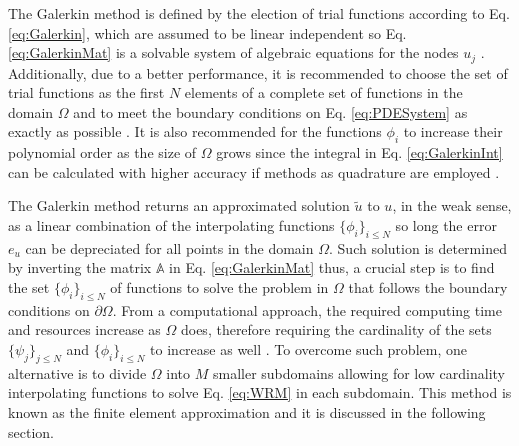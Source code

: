     The Galerkin method is defined by the election of trial functions according to Eq. \eqref{eq:Galerkin}, which are assumed to be linear independent so Eq. \eqref{eq:GalerkinMat} is a solvable system of algebraic equations for the nodes $u_j$ \cite{fletcher_computational_1984}. Additionally, due to a  better performance, it is recommended to choose the set of trial functions as the first $N$ elements of a complete set of functions in the domain $\Omega$ and to meet the boundary conditions on Eq. \eqref{eq:PDESystem} as exactly as possible \cite{fletcher_computational_1984}. It is also recommended for the functions $\phi_i$ to increase their polynomial order as the size of $\Omega$ grows since the integral in   Eq. \eqref{eq:GalerkinInt} can be calculated with higher accuracy if methods as quadrature are employed \cite{fletcher_computational_1984}.

    The Galerkin method returns an approximated solution $\tilde{u}$ to $u$, in the weak sense, as a linear combination of the interpolating functions $\{\phi_i\}_{i\leq N}$ so long the error $e_{u}$ can be depreciated for all points in the domain $\Omega$.  Such solution is determined by inverting the matrix $\mathbb{A}$ in Eq. \eqref{eq:GalerkinMat} thus, a crucial step is to find the set $\{\phi_i\}_{i\leq N}$ of functions to solve the problem in $\Omega$ that follows the boundary conditions on $\partial\Omega$.  From a computational approach, the required computing time and resources increase as $\Omega$ does, therefore requiring the cardinality of the sets $\{\psi_j\}_{j\leq N}$ and  $\{\phi_i\}_{i\leq N}$ to increase as well \cite{dhatt_finite_2012}. To overcome such problem, one alternative is to divide $\Omega$ into $M$ smaller subdomains allowing for low cardinality interpolating functions to solve Eq. \eqref{eq:WRM}  in each subdomain.  This method is known as the finite element approximation and it is discussed in the following section.
